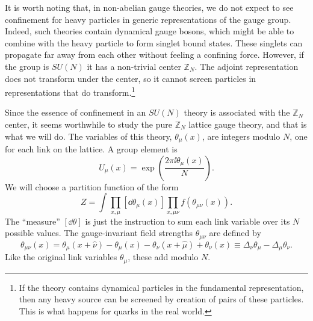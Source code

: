 It is worth noting that, in non-abelian gauge theories, we do not expect to see
confinement for heavy particles in generic representations of the gauge group.
Indeed, such theories contain dynamical gauge bosons, which might be able to
combine with the heavy particle to form singlet bound states. These singlets can
propagate far away from each other without feeling a confining force. However,
if the group is $SU(N)$ it has a non-trivial center $\mathbb Z_N$. The adjoint
representation does not transform under the center, so it cannot screen
particles in representations that do transform.\footnote[11]{If the theory
contains dynamical particles in the fundamental representation, then any heavy
source can be screened by creation of pairs of these particles. This is what
happens for quarks in the real world.}

Since the essence of confinement in an $SU(N)$ theory is associated with the
$\mathbb Z_N$ center, it seems worthwhile to study the pure $\mathbb Z_N$
lattice gauge theory, and that is what we will do. The variables of this theory,
$\theta_\mu(x)$, are integers modulo $N$, one for each link on the lattice. A
group element is
\begin{equation*}
  U_\mu(x)=\exp\!\left(\frac{2\pi\ii\theta_\mu(x)}{N}\right).
\end{equation*}
We will choose a partition function of the form
\begin{equation*}
  Z=\int\prod_{x,\mu}[\dd\theta_\mu(x)]
  \prod_{x,\mu\nu}f(\theta_{\mu\nu}(x)).
\end{equation*}
The ``measure'' $[\dd\theta]$ is just the instruction to sum each link variable
over its $N$ possible values. The gauge-invariant field strengths
$\theta_{\mu\nu}$ are defined by
\begin{equation*}
  \theta_{\mu\nu}(x)=\theta_\mu(x+\hat\nu)-\theta_\mu(x)
  -\theta_\nu(x+\hat\mu)+\theta_\nu(x)
  \equiv\Delta_\nu\theta_\mu-\Delta_\mu\theta_\nu.
\end{equation*}
Like the original link variables $\theta_\mu$, these add modulo $N$.

